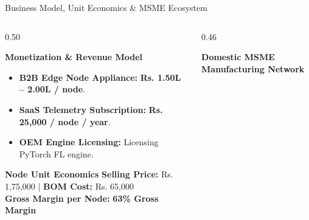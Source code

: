 \documentclass[aspectratio=169, 11pt]{beamer}
\begin{document}
\begin{frame}{Business Model, Unit Economics \& MSME Ecosystem}
    \begin{columns}[c]
        \begin{column}{0.50\textwidth}
            \begin{block}{\textcolor{neonCyan}{\textbf{Monetization \& Revenue Model}}}
                \tiny
                \begin{itemize}
                    \item \textbf{B2B Edge Node Appliance:} \textbf{Rs. 1.50L -- 2.00L / node}.
                    \item \textbf{SaaS Telemetry Subscription:} \textbf{Rs. 25,000 / node / year}.
                    \item \textbf{OEM Engine Licensing:} Licensing PyTorch FL engine.
                \end{itemize}
            \end{block}
            
            \begin{block}{\textcolor{neonTeal}{\textbf{Node Unit Economics}}}
                \tiny
                \textbf{Selling Price:} Rs. 1,75,000 \quad | \quad \textbf{BOM Cost:} Rs. 65,000 \\
                \textbf{Gross Margin per Node:} \textbf{\textcolor{neonTeal}{63\% Gross Margin}}
            \end{block}
        \end{column}
        
        \begin{column}{0.46\textwidth}
            \begin{block}{\textcolor{neonAmber}{\textbf{Domestic MSME Manufacturing Network}}}
                \centering
                \vspace{0.2cm}
\end{block}
\end{column}
\end{columns}
\end{frame}
\end{document}
